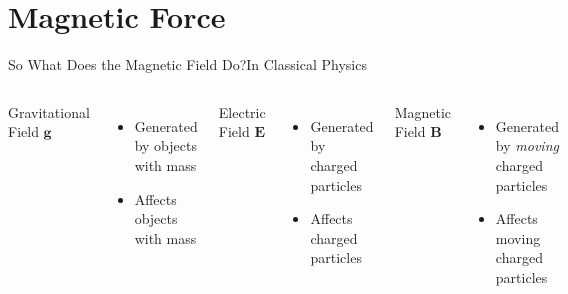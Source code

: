 \documentclass[12pt,aspectratio=169]{beamer}
\newcommand{\mb}[1]{\mathbf{#1}}
\begin{document}
\section{Magnetic Force}

\begin{frame}{So What Does the Magnetic Field Do?}{In Classical Physics}
  \begin{columns}
    \begin{center}
      Gravitational Field $\mb{g}$
    \end{center}
    \begin{itemize}
    \item Generated by objects with mass
    \item Affects objects with mass
    \end{itemize}

    \begin{center}
      Electric Field $\mb{E}$
    \end{center}
    \begin{itemize}
    \item Generated by charged particles
    \item Affects charged particles
    \end{itemize}

    \begin{center}
      Magnetic Field $\mb{B}$
    \end{center}
    \begin{itemize}
    \item Generated by \emph{moving} charged particles
    \item Affects moving charged particles
    \end{itemize}
  \end{columns}
\end{frame}
\end{document}
